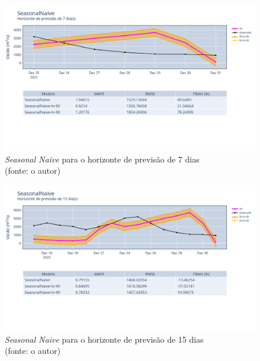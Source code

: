 \begin{figure}[!h]
	\centering
	\includegraphics[scale=0.33]{Figuras/jequiti/resultados/SeasonalNaive_fh7.png}
	\caption{\textit{Seasonal Naive} para o horizonte de previsão de 7 dias\\(fonte: o autor)}
	\label{fig:jequiti_SeasonalNaive_fh7}
\end{figure}

\begin{figure}[!h]
	\centering
	\includegraphics[scale=0.33]{Figuras/jequiti/resultados/SeasonalNaive_fh15.png}
	\caption{\textit{Seasonal Naive} para o horizonte de previsão de 15 dias\\(fonte: o autor)}
	\label{fig:jequiti_SeasonalNaive_fh15}
\end{figure}


